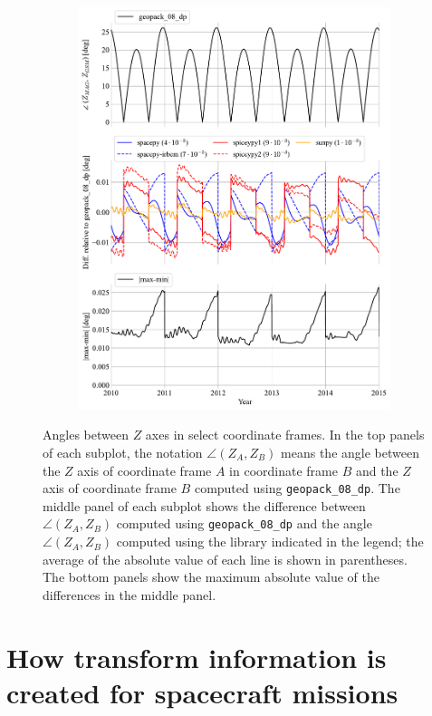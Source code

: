 \documentclass[draft]{agujournal2019}
\begin{document}
\begin{figure}[htb]
\begin{subfigure}[b]{0.49\textwidth}
         \includegraphics[width=\textwidth]{code/figures/angles/z-delta=1days_20100101-20150101/MAG_GSM.pdf}
     \end{subfigure}
     \caption{Angles between $Z$ axes in select coordinate frames. In the top panels of each subplot, the notation $\angle (Z_A, Z_B)$ means the angle between the $Z$ axis of coordinate frame $A$ in coordinate frame $B$ and the $Z$ axis of coordinate frame $B$ computed using \texttt{geopack\_08\_dp}. The middle panel of each subplot shows the difference between $\angle (Z_A, Z_B)$ computed using \texttt{geopack\_08\_dp} and the angle $\angle (Z_A, Z_B)$ computed using the library indicated in the legend; the average of the absolute value of each line is shown in parentheses. The bottom panels show the maximum absolute value of the differences in the middle panel.}
     \label{fig:angles}
\end{figure}

\clearpage

\section{How transform information is created for spacecraft missions}
\label{sect:missions}
\end{document}
